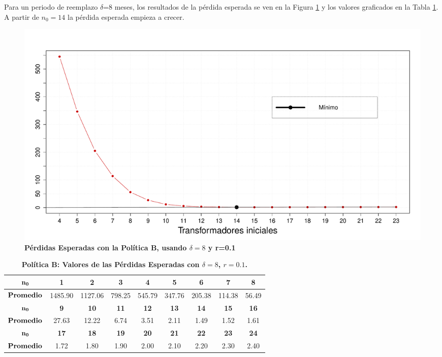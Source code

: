 \noindent Para un periodo de reemplazo $\delta$=8 meses, los resultados de la p\'erdida  esperada se ven en la Figura \ref{fi} y los valores graficados en la Tabla \ref{r12}. A partir de $n_0=14$ la p\'erdida  esperada empieza a crecer.
\begin{figure}[h!]
\begin{center}
\includegraphics[scale=0.3]{utilpeso01delta8.pdf}
\end{center}

\vspace{-1 cm}\caption{\bf P\'erdidas Esperadas con la Pol\'itica B, usando $\delta=8$ y r=0.1}\label{fi}
\end{figure}
\begin{table}[h!]\small
\centering
\caption{\bf Pol\'itica B: Valores de las P\'erdidas Esperadas con $\delta=8$, $r=0.1$.}\label{r12}
\begin{tabular}{ccccccccc}
\toprule[0.6mm]
$\bf{n_0}$ &\bf{1} &                   \bf{2} &                   \bf{3} &                   \bf{ 4 }&                    \bf{ 5}&              \bf{ 6} &               \bf{ 7} & \bf{8} \\
\hline
${\bf Promedio}$ & 1485.90 &1127.06 & 798.25  &545.79 & 347.76 & 205.38 & 114.38 &  56.49  \\
\hline
$\bf{n_0}$&\bf{9} &                \bf{ 10}&              \bf{      11} &                   \bf{ 12} &               \bf{      13}&              \bf{14} &  \bf{ 15} & \bf{16 }   \\
\hline
${\bf Promedio}$&	27.63 &  12.22 &   6.74 &   3.51  &  2.11&    1.49 &   1.52 &   1.61 \\
	 \hline
	
$\bf{n_0}$&\bf{17} &     \bf{ 18}&   \bf{19}&   \bf{ 20} &           \bf{   21}&                \bf{  22}  & \bf{23} &\bf{24}  \\
\hline
${\bf Promedio}$ &  1.72 &  1.80  &  1.90 &   2.00   & 2.10   & 2.20 &   2.30 &  2.40  \\
\toprule[0.6mm]
\end{tabular}

\end{table}


